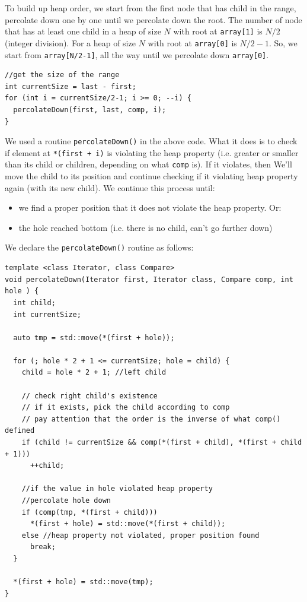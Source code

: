 \documentclass[11pt]{book}
\begin{document}
To build up heap order, we start from the first node that has child in the range, percolate down one by one until we percolate down the root. The number of node that has at least one child in a heap of size \(N\) with root at \texttt{array[1]} is \(N/2\) (integer division). For a heap of size \(N\) with root at \texttt{array[0]} is \(N/2-1\). So, we start from \texttt{array[N/2-1]}, all the way until we percolate down \texttt{array[0]}.

\begin{verbatim}
//get the size of the range 
int currentSize = last - first;
for (int i = currentSize/2-1; i >= 0; --i) {
  percolateDown(first, last, comp, i);
}

\end{verbatim}
We used a routine \texttt{percolateDown()} in the above code. What it does is to check if element at \texttt{*(first + i)} is violating the heap property (i.e. greater or smaller than its child or children, depending on what \texttt{comp} is). If it violates, then We'll move the child to its position and continue checking if it violating heap property again (with its new child). We continue this process until:
\begin{itemize}
\item we find a proper position that it does not violate the heap property. Or:
\item the hole reached bottom (i.e. there is no child, can't go further down)
\end{itemize}

We declare the \texttt{percolateDown()} routine as follows:
\begin{verbatim}
template <class Iterator, class Compare>
void percolateDown(Iterator first, Iterator class, Compare comp, int hole ) {
  int child;
  int currentSize;

  auto tmp = std::move(*(first + hole));

  for (; hole * 2 + 1 <= currentSize; hole = child) {
    child = hole * 2 + 1; //left child

    // check right child's existence
    // if it exists, pick the child according to comp
    // pay attention that the order is the inverse of what comp() defined
    if (child != currentSize && comp(*(first + child), *(first + child + 1)))
      ++child;

    //if the value in hole violated heap property
    //percolate hole down
    if (comp(tmp, *(first + child)))
      *(first + hole) = std::move(*(first + child));
    else //heap property not violated, proper position found
      break;
  }

  *(first + hole) = std::move(tmp);  
}


\end{verbatim}
\end{document}

